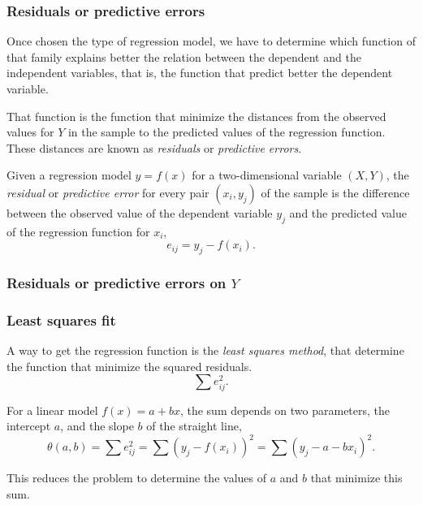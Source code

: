 \begin{frame}
\frametitle{Residuals or predictive errors}
Once chosen the type of regression model, we have to determine which function of that family explains better the
relation between the dependent and the independent variables, that is, the function that predict better the
dependent variable. 

That function is the function that minimize the distances from the observed values for $Y$ in the sample to the
predicted values of the regression function.
These distances are known as \emph{residuals} or \emph{predictive errors}.

\begin{definition}
Given a regression model $y=f(x)$ for a two-dimensional variable $(X,Y)$, the \emph{residual} or \emph{predictive error}
for every pair $(x_i,y_j)$ of the sample is the difference between the observed value of the dependent variable $y_j$
and the predicted value of the regression function for $x_i$,
\[
e_{ij} = y_j-f(x_i).
\]
\end{definition}
\end{frame}


\begin{frame}
\frametitle{Residuals or predictive errors on $Y$}
\centering
\resizebox{0.9\textwidth}{!}{}
\end{frame}


\begin{frame}
\frametitle{Least squares fit}
A way to get the regression function is the \emph{least squares method}, that determine the function that minimize the
squared residuals.
\[
\sum e_{ij}^2.
\]

For a linear model $f(x) = a + bx$, the sum depends on two parameters, the intercept $a$, and the slope $b$ of the
straight line,
\[
\theta(a,b) = \sum e_{ij}^2 =\sum (y_j - f(x_i))^2 =\sum (y_j-a-bx_i)^2.
\]

This reduces the problem to determine the values of $a$ and $b$ that minimize this sum. 
\end{frame}


